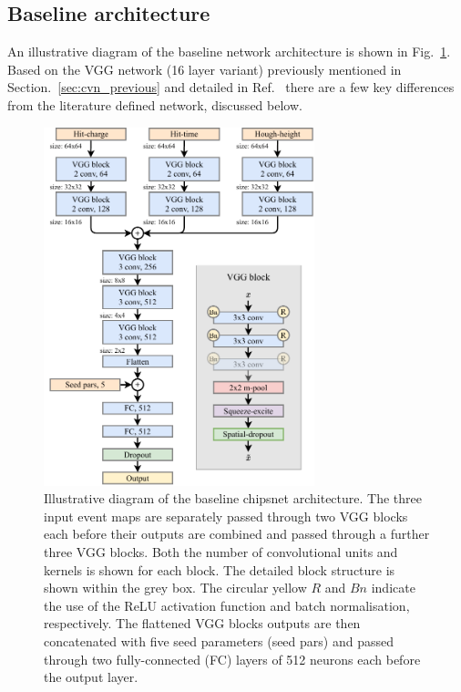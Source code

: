 \subsection{Baseline architecture} %
\label{sec:cvn_baseline_arch} %

An illustrative diagram of the baseline network architecture is shown in Fig.~\ref{fig:chipsnet}.
Based on the VGG network (16 layer variant) previously mentioned in
Section.~\ref{sec:cvn_previous} and detailed in Ref.~\cite{simonyan2014} there are a few key
differences from the literature defined network, discussed below.

\begin{figure} %
    \includegraphics[width=0.7\textwidth]{diagrams/6-cvn/chipsnet.pdf}
    \caption[Illustrative diagram of the baseline chipsnet architecture.]
    {Illustrative diagram of the baseline chipsnet architecture. The three input event maps are
        separately passed through two VGG blocks each before their outputs are combined and passed
        through a further three VGG blocks. Both the number of convolutional units and kernels is
        shown for each block. The detailed block structure is shown within the grey box. The
        circular yellow $R$ and $Bn$ indicate the use of the ReLU activation function and batch
        normalisation, respectively. The flattened VGG blocks outputs are then concatenated with
        five seed parameters (seed pars) and passed through two fully-connected (FC) layers of 512
        neurons each before the output layer.}
    \label{fig:chipsnet}
\end{figure}

